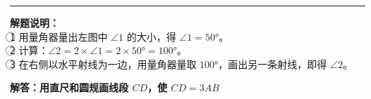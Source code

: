 \documentclass[12pt, a4paper]{ctexart}
\begin{document}
\vspace{1cm}
\hrule
\vspace{0.4cm}

{\small\color{gray}
\textbf{解题说明：}\\
\textcircled{1} 用量角器量出左图中 $\angle 1$ 的大小，得 $\angle 1 = 50°$。\\
\textcircled{2} 计算：$\angle 2 = 2 \times \angle 1 = 2 \times 50° = 100°$。\\
\textcircled{3} 在右侧以水平射线为一边，用量角器量取 $100°$，画出另一条射线，即得 $\angle 2$。
}


\newpage

\begin{center}
  {\large\bfseries 解答：用直尺和圆规画线段 $CD$，使 $CD = 3AB$}
\end{center}

\vspace{0.6cm}
\end{document}
